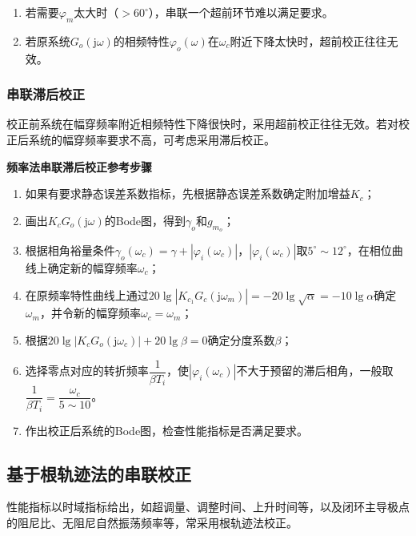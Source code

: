 \documentclass[cn, blue, normal, 12pt]{elegantnote}
\begin{document}
\begin{enumerate}
    \setlength{\itemsep}{6pt}
    \item 若需要$\varphi_m$太大时（$>60^{\circ}$），串联一个超前环节难以满足要求。
    \item 若原系统$G_o(\mathrm{j}\omega)$的相频特性$\varphi_o(\omega)$在$\omega_c$附近下降太快时，超前校正往往无效。
\end{enumerate}

\subsubsection{串联滞后校正}

校正前系统在幅穿频率附近相频特性下降很快时，采用超前校正往往无效。若对校正后系统的幅穿频率要求不高，可考虑采用滞后校正。

\textbf{频率法串联滞后校正参考步骤}

\begin{enumerate}
    \setlength{\itemsep}{6pt}
    \item 如果有要求静态误差系数指标，先根据静态误差系数确定附加增益$K_{c}$；
    \item 画出$K_{c}G_o(\mathrm{j}\omega)$的Bode图，得到$\gamma_o$和$g_{m_o}$；
    \item 根据相角裕量条件$\gamma_o(\omega_c)=\gamma+|\varphi_i(\omega_c)|$，$|\varphi_i(\omega_c)|$取$5^{\circ}\sim 12^{\circ}$，在相位曲线上确定新的幅穿频率$\omega_c$；
    \item 在原频率特性曲线上通过$20\lg{|K_{c_1}G_c(\mathrm{j}\omega_m)|}=-20\lg{\sqrt{\alpha}}=-10\lg{\alpha}$确定$\omega_m$，并令新的幅穿频率$\omega_c=\omega_m$；
    \item 根据$20\lg{|K_c G_o(\mathrm{j}\omega_c)|}+20\lg{\beta}=0$确定分度系数$\beta$；
    \item 选择零点对应的转折频率$\dfrac{1}{\beta T_i}$，使$|\varphi_i(\omega_c)|$不大于预留的滞后相角，一般取$\dfrac{1}{\beta T_i}=\dfrac{\omega_c}{5\sim 10}$。
    \item 作出校正后系统的Bode图，检查性能指标是否满足要求。
\end{enumerate}

\subsection{基于根轨迹法的串联校正}

性能指标以时域指标给出，如超调量、调整时间、上升时间等，以及闭环主导极点的阻尼比、无阻尼自然振荡频率等，常采用根轨迹法校正。
\end{document}
